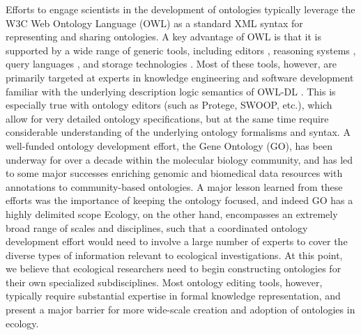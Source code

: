 \documentclass[5p,authoryear]{elsarticle}
\begin{document}
Efforts to engage scientists in the development of ontologies
typically leverage the W3C Web Ontology Language (OWL)
\citep{smith04:_owl_web_ontol_languag_guide} as a standard XML syntax
for representing and sharing ontologies. A key advantage of OWL is
that it is supported by a wide range of generic tools, including
editors
\citep{knublauch04:_editin_descr_logic_ontol_with,kalyanpur05:_swoop},
reasoning systems
\citep{sirin07:_pellet,tsarkov06:_fact_descr_logic_reason}, query
languages
\citep{prudhommeaux08:_sparq_query_languag_for_rdf,motik05:_query_answer_for_owl_dl_with_rules},
and storage technologies
\citep{carroll04:_jena,broekstra02:_sesam}. Most of these tools,
however, are primarily targeted at experts in knowledge engineering
and software development familiar with the underlying description
logic semantics of OWL-DL \citep{grau08:_owl}. This is especially true
with ontology editors (such as Protege, SWOOP, etc.), which allow for
very detailed ontology specifications, but at the same time require
considerable understanding of the underlying ontology formalisms and
syntax.  A well-funded ontology development effort, the Gene Ontology
(GO), has been underway for over a decade within the molecular biology
community, and has led to some major successes enriching genomic and
biomedical data resources with annotations to community-based
ontologies. A major lesson learned from these efforts was the
importance of keeping the ontology focused, and indeed GO has a highly
delimited scope \citep{bada04:_short_study_succes_of_gene_ontol}
Ecology, on the other hand, encompasses an extremely broad range of
scales and disciplines, such that a coordinated ontology development
effort would need to involve a large number of experts to cover the
diverse types of information relevant to ecological investigations.
At this point, we believe that ecological researchers need to begin
constructing ontologies for their own specialized subdisciplines.
Most ontology editing tools, however, typically require substantial
expertise in formal knowledge representation, and present a major
barrier for more wide-scale creation and adoption of ontologies in
ecology.
\end{document}
